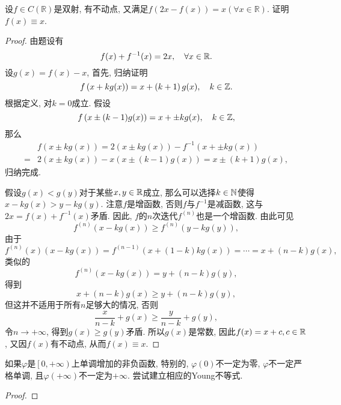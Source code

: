 \begin{quizb}
\woe 设\(f\in C(\mathbb{R})\)是双射, 有不动点, 又满足\(f(2x-f(x))=x(\forall x\in\mathbb{R})\). 证明\(f(x)\equiv x\).
\begin{proof}
由题设有\[f(x)+f^{-1}(x)=2x,\quad \forall x\in\mathbb{R}.\]设\(g(x)=f(x)-x\), 首先, 归纳证明\[f\left(x+kg(x)\right)=x+\left(k+1\right)g(x),\quad k\in\mathbb{Z}.\]根据定义, 对\(k=0\)成立. 假设\[f\left(x\pm (k-1)g(x)\right)=x+\pm kg(x),\quad k\in\mathbb{Z},\]那么\[\begin{split}
&f(x\pm kg(x))=2\left(x\pm kg(x)\right)-f^{-1}\left(x+\pm kg(x)\right)\\
=&2\left(x\pm kg(x)\right)-x\left(x\pm (k-1)g(x)\right)=x\pm \left(k+1\right)g(x),
\end{split}\]归纳完成.

假设\(g(x)<g(y)\)对于某些\(x,y\in\mathbb{R}\)成立, 那么可以选择\(k\in\mathbb{N}\)使得\(x-kg(x)>y-kg(y)\). 注意\(f\)是增函数, 否则\(f\)与\(f^{-1}\)是减函数, 这与\(2x=f(x)+f^{-1}(x)\)矛盾. 因此, \(f\)的\(n\)次迭代\(f^{(n)}\)也是一个增函数. 由此可见\[f^{(n)}\left(x-kg(x)\right)\geqslant f^{(n)}\left(y-kg(y)\right),\]由于\(f^{(n)}(x)\left(x-kg(x)\right)=f^{(n-1)}\left(x+(1-k)kg(x)\right)=\cdots=x+(n-k)g(x),\)类似的\[f^{(n)}\left(x-kg(x)\right)=y+(n-k)g(y),\]得到\[x+(n-k)g(x)\geqslant y+(n-k)g(y),\]但这并不适用于所有\(n\)足够大的情况, 否则\[\frac{x}{n-k}+g(x)\geqslant\frac{y}{n-k}+g(y),\]令\(n\rightarrow+\infty\), 得到\(g(x)\geqslant g(y)\)矛盾. 所以\(g(x)\)是常数, 因此\(f(x)=x+c,c\in\mathbb{R}\), 又因\(f(x)\)有不动点, 从而\(f(x)\equiv x\). 
\end{proof}
\woe 如果\(\varphi\)是\(\left[0,+\infty\right)\)上单调增加的非负函数, 特别的, \(\varphi(0)\)不一定为零, \(\varphi\)不一定严格单调, 且\(\varphi(+\infty)\)不一定为\(+\infty\). 尝试建立相应的Young不等式.
\begin{proof}


\end{proof}
\end{quizb}
